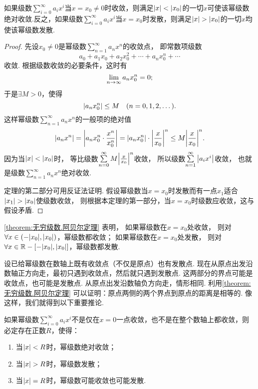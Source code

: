 \begin{theorem}[阿贝尔定理]\label{theorem:无穷级数.阿贝尔定理}
如果级数\(\sum\limits_{i=0}^\infty a_i x^i\)当\(x=x_0\neq0\)时收敛，则满足\(\abs{x}<\abs{x_0}\)的一切\(x\)可使该幂级数绝对收敛.反之，如果级数\(\sum\limits_{i=0}^\infty a_i x^i\)当\(x=x_0\)时发散，则满足\(\abs{x}>\abs{x_0}\)的一切\(x\)均使该幂级数发散.
\begin{proof}
先设\(x_0\neq0\)是幂级数\(\sum\limits_{n=1}^\infty a_n x^n\)的收敛点，
即常数项级数\[
a_0 + a_1 x_0 + a_2 x_0^2 + \dotsb + a_n x_0^n + \dotsb
\]收敛.
根据级数收敛的必要条件，这时有\[
\lim\limits_{n\to\infty} a_n x_0^n = 0;
\]
于是\(\exists M > 0\)，使得\[
\abs{a_n x_0^n} \leq M
\quad(n=0,1,2,\dotsc).
\]
这样幂级数\(\sum\limits_{n=1}^\infty a_n x^n\)的一般项的绝对值\[
\abs{a_n x^n} = \abs{a_n x_0^n \cdot \frac{x^n}{x_0^n}}
= \abs{a_n x_0^n} \cdot \abs{\frac{x}{x_0}}^n
\leq M \abs{\frac{x}{x_0}}^n.
\]
因为当\(\abs{x}<\abs{x_0}\)时，
等比级数\(\sum\limits_{n=0}^\infty M \abs{\frac{x}{x_0}}^n\)收敛，
所以级数\(\sum\limits_{n=1}^\infty \abs{a_i x^i}\)收敛，
也就是级数\(\sum\limits_{n=1}^\infty a_n x^n\)绝对收敛.

定理的第二部分可用反证法证明.
假设幂级数当\(x=x_0\)时发散而有一点\(x_1\)适合\(\abs{x_1}>\abs{x_0}\)使级数收敛，
则根据本定理的第一部分，当\(x=x_0\)时级数应收敛，这与假设矛盾.
\end{proof}
\end{theorem}

\cref{theorem:无穷级数.阿贝尔定理} 表明，
如果幂级数在\(x=x_0\)处收敛，
则对\(\forall x\in(-\abs{x_0},\abs{x_0})\)，幂级数都收敛；
如果幂级数在\(x=x_0\)处发散，
则对\(\forall x\in\mathbb{R}-[-\abs{x_0},\abs{x_0}]\)，幂级数都发散.

设已给幂级数在数轴上既有收敛点（不仅是原点）也有发散点.
现在从原点出发沿数轴正方向走，最初只遇到收敛点，然后就只遇到发散点.
这两部分的界点可能是收敛点，也可能是发散点.
从原点出发沿数轴负方向走，情形相同.
利用\cref{theorem:无穷级数.阿贝尔定理} 可以证明：原点两侧的两个界点到原点的距离是相等的.
像这样，我们就得到以下重要推论.
\begin{corollary}\label{theorem:无穷级数.阿贝尔定理推论}
如果幂级数\(\sum\limits_{i=0}^\infty a_i x^i\)不是仅在\(x=0\)一点收敛，也不是在整个数轴上都收敛，则必定存在正数\(R\)，使得：\begin{enumerate}
\item 当\(\abs{x}<R\)时，幂级数绝对收敛；
\item 当\(\abs{x}>R\)时，幂级数发散；
\item 当\(\abs{x}=R\)时，幂级数可能收敛也可能发散.
\end{enumerate}
\end{corollary}

